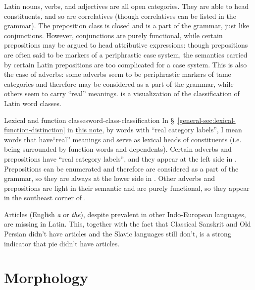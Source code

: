 \documentclass[UTF8, a4paper, oneside]{report}
\newcommand*{\citesec}[1]{\S~{#1}}
\newcommand{\corpus}[1]{\emph{#1}}
\newcommand{\general}{\href{../methodology/glossing.pdf}{this note}}
\begin{document}
Latin nouns, verbs, and adjectives are all open categories.
They are able to head constituents,
and so are correlatives (though correlatives can be listed in the grammar).
The preposition class is closed and is a part of the grammar,
just like conjunctions.
However, conjunctions are purely functional,
while certain prepositions may be argued to head attributive expressions:
though prepositions are often said to be markers of a periphrastic case system,
the semantics carried by certain Latin prepositions are too complicated for a case system.
This is also the case of adverbs:
some adverbs seem to be periphrastic markers of \acs{tame} categories
and therefore may be considered as a part of the grammar,
while others seem to carry ``real'' meanings.
 is a visualization of the classification of Latin word classes.

\begin{theorybox}{Lexical and function classes}{word-class-classification}
    In \citesec{\ref{general-sec:lexical-function-distinction}} in \general, 
    by words with ``real category labels'',
    I mean words that have``real'' meanings
    and serve as lexical heads of constituents
    (i.e. being surrounded by function words and dependents).
    Certain adverbs and prepositions have ``real category labels'',
    and they appear at the left side in .
    Prepositions can be enumerated and therefore are considered as a part of the grammar,
    so they are always at the lower side in .
    Other adverbs and prepositions are light in their semantic
    and are purely functional,
    so they appear in the southeast corner of .
\end{theorybox}

\begin{sidewaysfigure}
    \centering
    
    \caption{Latin word classes}
    \label{fig:latin-word-class}
\end{sidewaysfigure}

Articles (English \corpus{a} or \corpus{the}), 
despite prevalent in other Indo-European languages,
are missing in Latin.
This, together with the fact that Classical Sanskrit and Old Persian didn't have articles 
and the Slavic languages still don't,
is a strong indicator that \ac{pie} didn't have articles. 

\section{Morphology}
\end{document}

